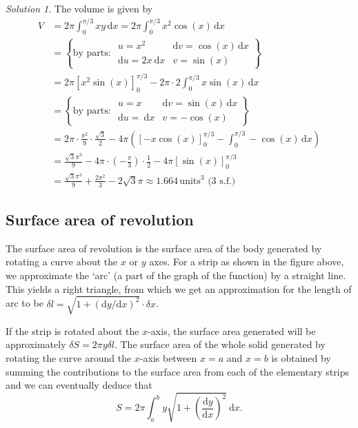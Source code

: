 \documentclass[
  english,
  11pt,
  oneside]{book}
\newcommand{\slide}{}
\theoremstyle{definition}
\theoremstyle{definition}
\theoremstyle{definition}
\theoremstyle{definition}
\theoremstyle{remark}
\newtheorem*{solution}{Solution}
\begin{document}
\begin{solution}
The volume is given by
\begin{align*}
V &=
2\pi\int_{0}^{\pi/3} xy\,\mathrm{d}x
= 2\pi\int_{0}^{\pi/3} x^2\cos(x)\,\mathrm{d}x\\
&= \left\{\text{by parts: }\begin{array}{ll} u=x^2 &  \mathrm{d}v=\cos(x)\,\mathrm{d}x \\ \mathrm{d}u=2x\ \mathrm{d}x & v=\sin(x)\end{array}\right\}\\
&=2\pi\left[x^2\sin(x)\right]_{0}^{\pi/3} - 2\pi\cdot 2\int_{0}^{\pi/3} x\sin(x)\,\mathrm{d}x\\
&= \left\{\text{by parts: }\begin{array}{ll} u=x &  \mathrm{d}v=\sin(x)\,\mathrm{d}x \\ \mathrm{d}u=\ \mathrm{d}x & v=-\cos(x)\end{array}\right\}\\
&=2\pi\cdot\frac{\pi^2}{9}\cdot\frac{\sqrt{3}}{2}-4\pi\left(\left[-x\cos(x)\right]_{0}^{\pi/3} - \int_{0}^{\pi/3} -\cos(x)\,\mathrm{d}x \right)\\
&=\frac{\sqrt{3}\pi^3}{9}-4\pi\cdot\left(-\frac{\pi}{3}\right)\cdot\frac{1}{2} - 4\pi\left[\sin(x)\right]_{0}^{\pi/3}\\
&=\frac{\sqrt{3}\pi^3}{9}+\frac{2\pi^2}{3}-2\sqrt{3}\pi \approx 1.664 \,\text{units}^3\text{ (3 s.f.)}
\end{align*}
\end{solution}

\slide

\subsection{Surface area of revolution}\label{surface-area-of-revolution}

The surface area of revolution is the surface area of the body generated by rotating a curve about the \(x\) or \(y\) axes. For a strip as shown in the figure above, we approximate the `arc' (a part of the graph of the function) by a straight line. This yields a right triangle, from which we get an approximation for the length of arc to be \(\delta l=\sqrt{1+(\mathrm{d}y/\mathrm{d}x)^2}\cdot\delta x\).

\slide

If the strip is rotated about the \(x\)-axis, the surface area generated will be approximately \(\delta S = 2\pi y\delta l\). The surface area of the whole solid generated by rotating the curve around the \(x\)-axis between \(x = a\) and \(x = b\) is obtained by summing the contributions to the surface area from each of the elementary strips and we can eventually deduce that
\[S = 2\pi\int_a^b y\sqrt{1+\left(\frac{\mathrm{d}y}{\mathrm{d}x}\right)^2}\ \mathrm{d}x.\]
\slide
\end{document}
